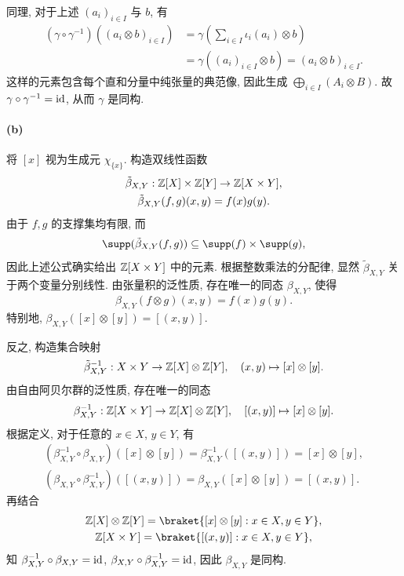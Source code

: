 \documentclass{article}
\begin{document}
\begin{solution}
	同理, 对于上述 $(a_i)_{i \in I}$ 与 $b$, 有
	\begin{align*}
		(\gamma \circ \gamma^{-1})((a_i \otimes b)_{i \in I})
		&= \gamma\left(\sum_{i \in I} \iota_i(a_i) \otimes b\right) \\
		&= \gamma((a_i)_{i \in I} \otimes b)
		= (a_i \otimes b)_{i \in I}.
	\end{align*}
	这样的元素包含每个直和分量中纯张量的典范像, 因此生成 $\bigoplus_{i \in I}(A_i \otimes B)$. 故 $\gamma \circ \gamma^{-1} = \operatorname{id}$, 从而 $\gamma$ 是同构.

	\paragraph{(b)} 将 $[x]$ 视为生成元 $\chi_{\{x\}}$. 构造双线性函数
	\begin{gather*}
		\tilde{\beta}_{X, Y}: \mathbb{Z}[X] \times \mathbb{Z}[Y] \to \mathbb{Z}[X \times Y], \\
		\tilde{\beta}_{X, Y}(f, g)(x, y) = f(x)g(y).
	\end{gather*}
	由于 $f, g$ 的支撑集均有限, 而
	\[ \supp(\tilde{\beta}_{X, Y}(f, g)) \subseteq \supp(f) \times \supp(g), \]
	因此上述公式确实给出 $\mathbb{Z}[X \times Y]$ 中的元素. 根据整数乘法的分配律, 显然 $\tilde{\beta}_{X, Y}$ 关于两个变量分别线性. 由张量积的泛性质, 存在唯一的同态 $\beta_{X, Y}$, 使得
	\[ \beta_{X, Y}(f \otimes g)(x, y) = f(x)g(y). \]
	特别地, $\beta_{X, Y}([x] \otimes [y]) = [(x, y)]$.

	反之, 构造集合映射
	\[
		\tilde{\beta}_{X, Y}^{-1}: X \times Y \to \mathbb{Z}[X] \otimes \mathbb{Z}[Y],
		\quad (x, y) \mapsto [x] \otimes [y].
	\]
	由自由阿贝尔群的泛性质, 存在唯一的同态
	\[
		\beta_{X, Y}^{-1}: \mathbb{Z}[X \times Y] \to \mathbb{Z}[X] \otimes \mathbb{Z}[Y],
		\quad [(x, y)] \mapsto [x] \otimes [y].
	\]
	根据定义, 对于任意的 $x \in X$, $y \in Y$, 有
	\begin{gather*}
		(\beta_{X, Y}^{-1} \circ \beta_{X, Y})([x] \otimes [y])
		= \beta_{X, Y}^{-1}([(x, y)]) = [x] \otimes [y], \\
		(\beta_{X, Y} \circ \beta_{X, Y}^{-1})([(x, y)])
		= \beta_{X, Y}([x] \otimes [y]) = [(x, y)].
	\end{gather*}
	再结合
	\begin{gather*}
		\Z[X] \otimes \Z[Y] = \braket{[x] \otimes [y]: x \in X, y \in Y}, \\
		\Z[X \times Y] = \braket{[(x, y)]: x \in X, y \in Y},
	\end{gather*}
	知 $\beta_{X, Y}^{-1} \circ \beta_{X, Y} = \operatorname{id}$, $\beta_{X, Y} \circ \beta_{X, Y}^{-1} = \operatorname{id}$, 因此 $\beta_{X, Y}$ 是同构.


\end{solution}
\end{document}
